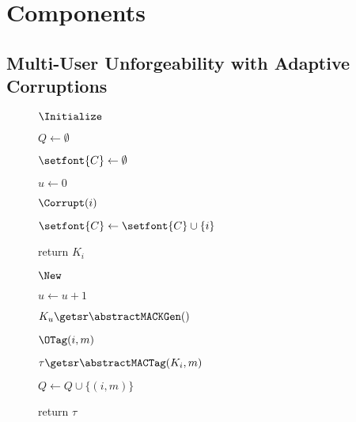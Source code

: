 \section{Components}
\label{sec:components}

\subsection{Multi-User Unforgeability with Adaptive Corruptions}

\begin{figure}[t]
	\centering
	
	\begin{minipage}[t]{0.2\textwidth}
		\NewExperiment[$\Gm^{\muEUFCMA}_{\abstractMACScheme,\advA}$]
		
		\begin{oracle}{$\Initialize$}
			\item $Q \gets \emptyset$
			\item $\setfont{C} \gets \emptyset$
			\item $u \gets 0$
		\end{oracle}
		
		\ExptSepSpace
		
			\begin{oracle}{$\Corrupt(i)$}
			\item $\setfont{C} \gets \setfont{C} \cup \{i\}$
			\item return $K_i$
		\end{oracle}
		\ExptSepSpace
	
			\end{minipage}
	\begin{minipage}[t]{0.3\textwidth}
		\vspace*{\iffull0.4cm\else0cm\fi}
		\begin{oracle}{$\New$}
			\item $u \gets u + 1$
			\item $K_u \getsr \abstractMACKGen()$
			\item[]
		\end{oracle}
		\ExptSepSpace
		\begin{oracle}{$\OTag(i, m)$}
			\item $\tau \getsr \abstractMACTag(K_i, m)$
			\item $Q \gets Q \cup \{(i, m)\}$
			\item return $\tau$
		\end{oracle}
		
		
		\ExptSepSpace
			\end{minipage}
	\begin{minipage}[t]{0.47\textwidth}
		\vspace*{.4cm}
		

\end{minipage}
\end{figure}
